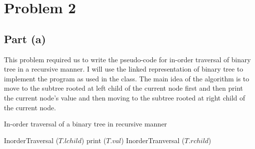 \documentclass{article}
\begin{document}
\section {Problem 2} {

    \subsection {Part (a)} {
        This problem required us to write the pseudo-code for in-order traversal of binary tree in a recursive manner. I will use the linked representation of binary tree to implement the program as used in the class. The main idea of the algorithm is to move to the subtree rooted at left child of the current node first and then print the current node's value and then moving to the subtree rooted at right child of the current node. \newline \\
        \colorbox[gray]{0.95} {  
        \begin{algorithm2e}[H]
        \caption{In-order traversal of a binary tree in recursive manner}
        \DontPrintSemicolon
          
          
          \vspace{5pt}
             {
                {
                    InorderTraversal ($T.lchild$)\;
                    print ($T.val$)\;
                    InorderTranversal ($T.rchild$)\;
                }
                \KwRet
            }
         \end{algorithm2e}
         }
    }
}
\end{document}

